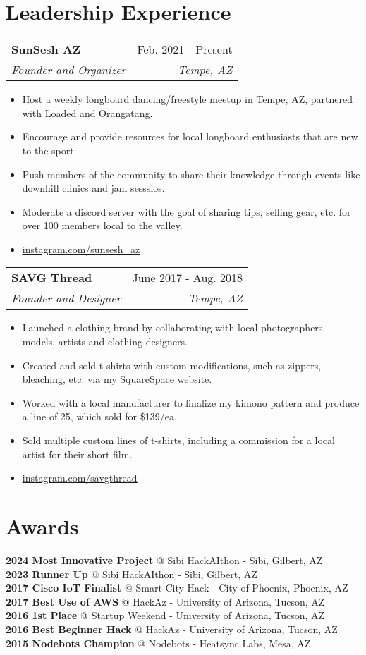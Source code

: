 \documentclass[letterpaper,11pt]{article}
\makeatletter
\newcommand{\resumeItem}[1]{
  \item\small{
    {#1 \vspace{-2pt}}
  }
}
\newcommand{\resumeSubheading}[4]{
  \vspace{-2pt}\item
    \begin{tabular*}{0.97\textwidth}[t]{l@{\extracolsep{\fill}}r}
      \textbf{#1} & #2 \\
      \textit{\small#3} & \textit{\small #4} \\
    \end{tabular*}\vspace{-7pt}
}
\newcommand{\resumeItemListStart}{\begin{itemize}}
\newcommand{\resumeItemListEnd}{\end{itemize}\vspace{-5pt}}
\makeatother
\begin{document}
%
\section{Leadership Experience}
\begin{itemize}[leftmargin=0.15in, label={}]
   \small{\item{
    \resumeSubheading
      {SunSesh AZ}{Feb. 2021 - Present}
      {Founder and Organizer}{Tempe, AZ}
      \resumeItemListStart
        \resumeItem{Host a weekly longboard dancing/freestyle meetup in Tempe, AZ, partnered with Loaded and Orangatang.}
        \resumeItem{Encourage and provide resources for local longboard enthusiasts that are new to the sport.}
        \resumeItem{Push members of the community to share their knowledge through events like downhill clinics and jam sesssios.}
        \resumeItem{Moderate a discord server with the goal of sharing tips, selling gear, etc. for over 100 members local to the valley.}
        \resumeItem{\href{https://www.instagram.com/...}{\underline{instagram.com/sunsesh\_az}}}
      \resumeItemListEnd
    \resumeSubheading
      {SAVG Thread}{June 2017 - Aug. 2018}
      {Founder and Designer}{Tempe, AZ}
      \resumeItemListStart
        \resumeItem{Launched a clothing brand by collaborating with local photographers, models, artists and clothing designers.}
        \resumeItem{Created and sold t-shirts with custom modifications, such as zippers, bleaching, etc. via my SquareSpace website.}
        \resumeItem{Worked with a local manufacturer to finalize my kimono pattern and produce a line of 25, which sold for \$139/ea.}
        \resumeItem{Sold multiple custom lines of t-shirts, including a commission for a local artist for their short film.}
        \resumeItem{\href{https://www.instagram.com/...}{\underline{instagram.com/savgthread}}}
      \resumeItemListEnd
   }}
\end{itemize}

%
\section{Awards}
\begin{itemize}[leftmargin=0.15in, label={}]
   \small{\item{
    \textbf{2024 Most Innovative Project}{ @ Sibi HackAIthon - Sibi, Gilbert, AZ} \\
    \textbf{2023 Runner Up}{ @ Sibi HackAIthon - Sibi, Gilbert, AZ} \\
    \textbf{2017 Cisco IoT Finalist}{ @ Smart City Hack - City of Phoenix, Phoenix, AZ} \\
    \textbf{2017 Best Use of AWS}{ @ HackAz - University of Arizona, Tucson, AZ} \\
    \textbf{2016 1st Place}{ @ Startup Weekend - University of Arizona, Tucson, AZ} \\
    \textbf{2016 Best Beginner Hack}{ @ HackAz - University of Arizona, Tucson, AZ} \\
    \textbf{2015 Nodebots Champion}{ @ Nodebots - Heatsync Labs, Mesa, AZ} \\
   }}
\end{itemize}

\end{document}
